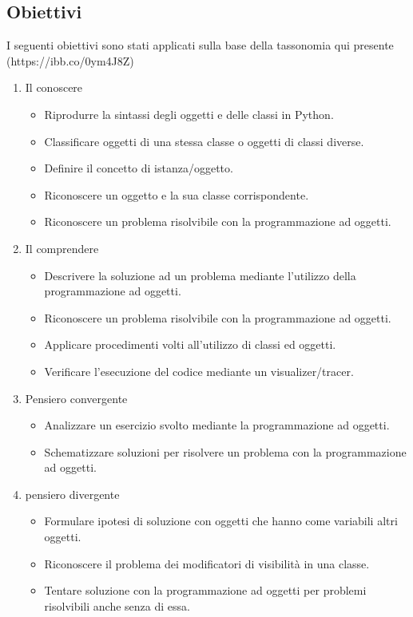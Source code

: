 \documentclass[12pt,a4paper]{article}
\begin{document}
\subsection{Obiettivi}\label{obiettivi-1}

I seguenti obiettivi sono stati applicati sulla base della tassonomia qui presente (https://ibb.co/0ym4J8Z)

\begin{enumerate}
   \item Il conoscere
   \begin{itemize}
     \item Riprodurre la sintassi degli oggetti e delle classi in Python.
     \item Classificare oggetti di una stessa classe o oggetti di classi diverse. 
     \item Definire il concetto di istanza/oggetto. 
     \item Riconoscere un oggetto e la sua classe corrispondente.
     \item Riconoscere un problema risolvibile con la programmazione ad oggetti.
   \end{itemize}
   \item Il comprendere
   \begin{itemize}
     \item Descrivere la soluzione ad un problema mediante l'utilizzo della programmazione ad oggetti.
     \item Riconoscere un problema risolvibile con la programmazione ad oggetti.
     \item Applicare procedimenti volti all’utilizzo di classi ed oggetti.
     \item Verificare l’esecuzione del codice mediante un visualizer/tracer.
   \end{itemize}
   \item Pensiero convergente
   \begin{itemize}
     \item Analizzare un esercizio svolto mediante la programmazione ad oggetti.
     \item Schematizzare soluzioni per risolvere un problema con la programmazione ad oggetti.
   \end{itemize}
   \item pensiero divergente
   \begin{itemize}
     \item Formulare ipotesi di soluzione con oggetti che hanno come variabili altri oggetti.
     \item Riconoscere il problema dei modificatori di visibilità in una classe.
     \item Tentare soluzione con la programmazione ad oggetti per problemi risolvibili anche senza di essa.
   \end{itemize}
\end{enumerate}
\end{document}
